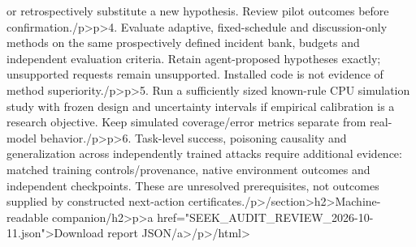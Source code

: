 or retrospectively substitute a new hypothesis. Review pilot outcomes before confirmation.\</p>\<p>4. Evaluate adaptive, fixed-schedule and discussion-only methods on the same prospectively defined incident bank, budgets and independent evaluation criteria. Retain agent-proposed hypotheses exactly; unsupported requests remain unsupported. Installed code is not evidence of method superiority.\</p>\<p>5. Run a sufficiently sized known-rule CPU simulation study with frozen design and uncertainty intervals if empirical calibration is a research objective. Keep simulated coverage/error metrics separate from real-model behavior.\</p>\<p>6. Task-level success, poisoning causality and generalization across independently trained attacks require additional evidence: matched training controls/provenance, native environment outcomes and independent checkpoints. These are unresolved prerequisites, not outcomes supplied by constructed next-action certificates.\</p>\</section>\<h2>Machine-readable companion\</h2>\<p>\<a href="SEEK_AUDIT_REVIEW_2026-10-11.json">Download report JSON\</a>\</p>\</html>